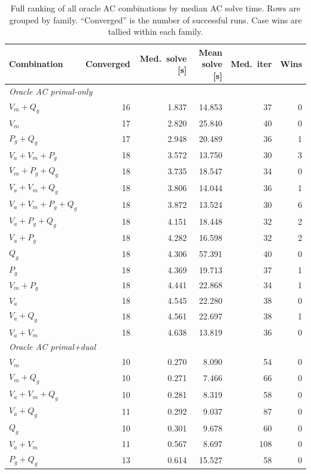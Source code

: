 \begin{table}[!t]
\centering
\scriptsize
\caption{Full ranking of all oracle AC combinations by median AC solve time. Rows are grouped by family. ``Converged'' is the number of successful runs. Case wins are tallied within each family.}
\label{tab:combo_rank_oracle}
\begin{tabular}{lrrrrr}
\toprule
Combination & Converged & Med.\ solve [s] & Mean solve [s] & Med.\ iter & Wins \\
\midrule
\multicolumn{6}{l}{\textit{Oracle AC primal-only}} \\
$V_m{+}Q_g$ & 16 & 1.837 & 14.853 & 37 & 0 \\
$V_m$ & 17 & 2.820 & 25.840 & 40 & 0 \\
$P_g{+}Q_g$ & 17 & 2.948 & 20.489 & 36 & 1 \\
$V_a{+}V_m{+}P_g$ & 18 & 3.572 & 13.750 & 30 & 3 \\
$V_m{+}P_g{+}Q_g$ & 18 & 3.735 & 18.547 & 34 & 0 \\
$V_a{+}V_m{+}Q_g$ & 18 & 3.806 & 14.044 & 36 & 1 \\
$V_a{+}V_m{+}P_g{+}Q_g$ & 18 & 3.872 & 13.524 & 30 & 6 \\
$V_a{+}P_g{+}Q_g$ & 18 & 4.151 & 18.448 & 32 & 2 \\
$V_a{+}P_g$ & 18 & 4.282 & 16.598 & 32 & 2 \\
$Q_g$ & 18 & 4.306 & 57.391 & 40 & 0 \\
$P_g$ & 18 & 4.369 & 19.713 & 37 & 1 \\
$V_m{+}P_g$ & 18 & 4.441 & 22.868 & 34 & 1 \\
$V_a$ & 18 & 4.545 & 22.280 & 38 & 0 \\
$V_a{+}Q_g$ & 18 & 4.561 & 22.697 & 38 & 1 \\
$V_a{+}V_m$ & 18 & 4.638 & 13.819 & 36 & 0 \\
\midrule
\multicolumn{6}{l}{\textit{Oracle AC primal+dual}} \\
$V_m$ & 10 & 0.270 & 8.090 & 54 & 0 \\
$V_m{+}Q_g$ & 10 & 0.271 & 7.466 & 66 & 0 \\
$V_a{+}V_m{+}Q_g$ & 10 & 0.281 & 8.319 & 58 & 0 \\
$V_a{+}Q_g$ & 11 & 0.292 & 9.037 & 87 & 0 \\
$Q_g$ & 10 & 0.301 & 9.678 & 60 & 0 \\
$V_a{+}V_m$ & 11 & 0.567 & 8.697 & 108 & 0 \\
$P_g{+}Q_g$ & 13 & 0.614 & 15.527 & 58 & 0 \\

\end{tabular}
\end{table}
